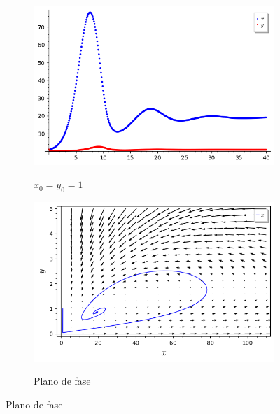 \begin{figure}[H]
    \centering
    \begin{subfigure}{0.4\textwidth}
        \includegraphics[scale=0.48]{figuras/HT_9.png}
        \label{fig:HT_9}
        \caption{$x_0 = y_0 = 1$}
    \end{subfigure}
    \begin{subfigure}{0.4\textwidth}
        \includegraphics[scale=0.48]{figuras/HT_10.png}
        \label{fig:HT_10}
        \caption{Plano de fase}
    \end{subfigure}
\end{figure}


